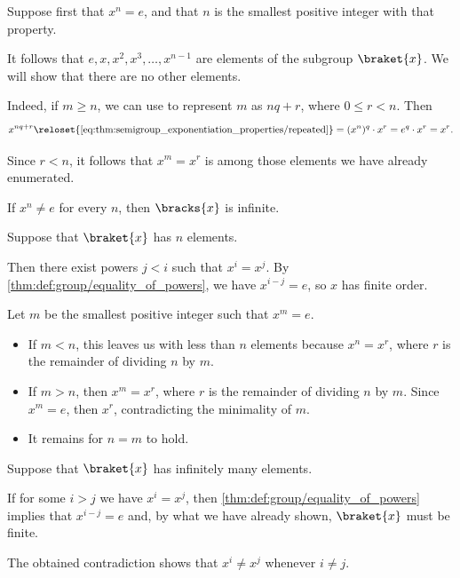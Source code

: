 \begin{defproof}

   Suppose first that \( x^n = e \), and that \( n \) is the smallest positive integer with that property.

  It follows that \( e, x, x^2, x^3, \ldots, x^{n-1} \) are elements of the subgroup \( \braket{ x } \). We will show that there are no other elements.

  Indeed, if \( m \geq n \), we can use  to represent \( m \) as \( nq + r \), where \( 0 \leq r < n \). Then
  \begin{equation*}
    x^{nq+r}
    \reloset {\eqref{eq:thm:semigroup_exponentiation_properties/repeated}} =
    (x^n)^q \cdot x^r
    =
    e^q \cdot x^r
    =
    x^r.
  \end{equation*}

  Since \( r < n \), it follows that \( x^m = x^r \) is among those elements we have already enumerated.

   If \( x^n \neq e \) for every \( n \), then \( \bracks{ x } \) is infinite.


   Suppose that \( \braket{ x } \) has \( n \) elements.

  Then there exist powers \( j < i \) such that \( x^i = x^j \). By \cref{thm:def:group/equality_of_powers}, we have \( x^{i - j} = e \), so \( x \) has finite order.

  Let \( m \) be the smallest positive integer such that \( x^m = e \).
  \begin{itemize}
    \item If \( m < n \), this leaves us with less than \( n \) elements because \( x^n = x^r \), where \( r \) is the remainder of dividing \( n \) by \( m \).

    \item If \( m > n \), then \( x^m = x^r \), where \( r \) is the remainder of dividing \( n \) by \( m \). Since \( x^m = e \), then \( x^r \), contradicting the minimality of \( m \).

    \item It remains for \( n = m \) to hold.
  \end{itemize}

   Suppose that \( \braket{ x } \) has infinitely many elements.

  If for some \( i > j \) we have \( x^i = x^j \), then \cref{thm:def:group/equality_of_powers} implies that \( x^{i-j} = e \) and, by what we have already shown, \( \braket{ x } \) must be finite.

  The obtained contradiction shows that \( x^i \neq x^j \) whenever \( i \neq j \).
\end{defproof}

